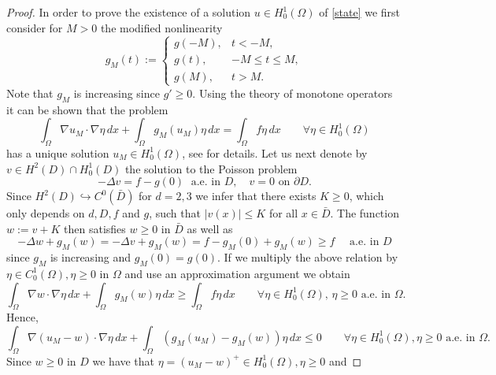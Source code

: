 \documentclass[10pt,a4paper]{amsart}
\newcommand{\dx}{\,dx}
\begin{document}
\begin{proof} In order to prove the existence of a solution $u \in H^1_0(\Omega)$ of
\eqref{state} we first consider for $M>0$ the modified nonlinearity
\begin{displaymath}
g_M(t):= \left\{
\begin{array}{cl}
g(-M), & t<-M, \\
g(t), & -M \leq t \leq M, \\
g(M), & t>M.
\end{array}
\right.
\end{displaymath}
Note that $g_M$ is increasing since $g' \geq 0$. 
Using the theory of monotone operators it can be shown that the problem
\begin{displaymath}
\int_\Omega \nabla u_M \cdot \nabla \eta \dx + \int_\Omega g_M(u_M) \eta \dx =
\int_\Omega f \eta \dx \qquad \forall \eta \in H^1_0(\Omega)
\end{displaymath}
has a unique solution $u_M \in H^1_0(\Omega)$, see \cite[Section 2.6]{VM25} for details.  Let us next denote by
$v \in H^2(D) \cap H^1_0(D)$ the solution to the Poisson problem
\begin{displaymath}
- \Delta v = f - g(0) \; \mbox{ a.e. in }  D, \quad v=0 \mbox{ on }  \partial D.  
\end{displaymath}
Since $H^2(D) \hookrightarrow C^0(\bar D)$ for $d=2,3$ we infer that there exists $K \geq 0$, which only depends on $d,D,f$ and $g$,
such that $| v(x) | \leq K$ for all $x \in \bar D$. The function $w:=v+K$ then satisfies
$w \geq 0$ in $\bar D$ as well as
\begin{displaymath}
- \Delta w + g_M(w) = -\Delta v + g_M(w) = f - g_M(0) + g_M(w) \geq f \quad \mbox{ a.e. in } D
\end{displaymath}
since $g_M$ is increasing and $g_M(0)=g(0)$. If we multiply the above relation by
$\eta \in C^1_0(\Omega), \eta \geq 0$ in  $\Omega$ and use an approximation argument we obtain
\begin{displaymath}
    \int_\Omega \nabla w \cdot \nabla \eta \dx + \int_\Omega g_M(w) \eta \dx \geq
    \int_\Omega f \eta \dx \qquad \forall \eta \in H^1_0(\Omega), \, \eta \geq 0 \mbox{ a.e. in } \Omega.
\end{displaymath}
Hence,
\begin{displaymath}
    \int_\Omega \nabla( u_M-w) \cdot \nabla \eta \dx + \int_\Omega (g_M(u_M)-g_M(w)) \eta \dx \leq
0 \qquad \forall \eta \in H^1_0(\Omega), \eta \geq 0 \mbox{ a.e. in } \Omega.
\end{displaymath}
Since $w \geq 0$ in $D$ we have that  $\eta =(u_M-w)^+ \in H^1_0(\Omega), \eta \geq 0$ and

\end{proof}
\end{document}
